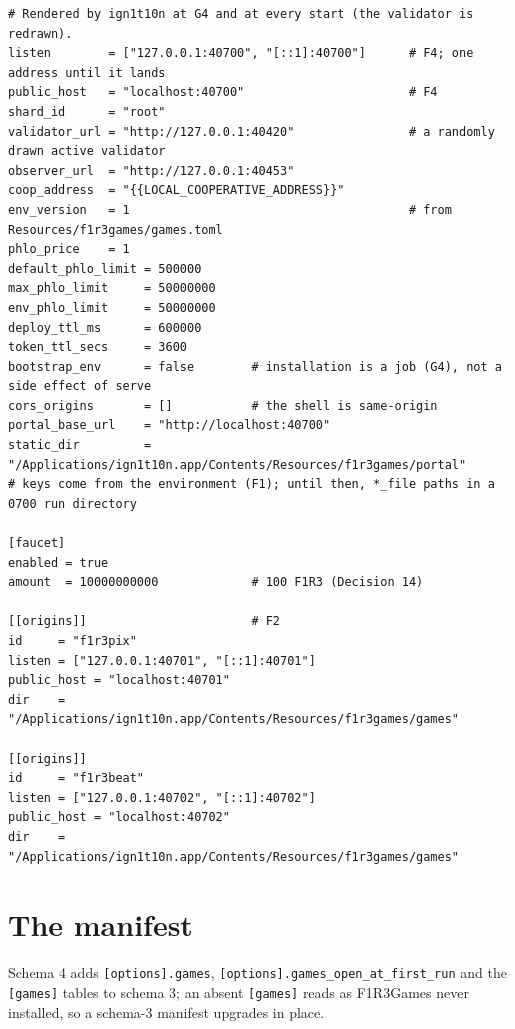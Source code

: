 \documentclass[11pt]{article}
\theoremstyle{definition}
\theoremstyle{remark}
\newcommand{\code}[1]{\texttt{#1}}
\newcommand{\Gm}{F1R3Games}
\begin{document}
\begin{lstlisting}[language=Conf]
# Rendered by ign1t10n at G4 and at every start (the validator is redrawn).
listen        = ["127.0.0.1:40700", "[::1]:40700"]      # F4; one address until it lands
public_host   = "localhost:40700"                       # F4
shard_id      = "root"
validator_url = "http://127.0.0.1:40420"                # a randomly drawn active validator
observer_url  = "http://127.0.0.1:40453"
coop_address  = "{{LOCAL_COOPERATIVE_ADDRESS}}"
env_version   = 1                                       # from Resources/f1r3games/games.toml
phlo_price    = 1
default_phlo_limit = 500000
max_phlo_limit     = 50000000
env_phlo_limit     = 50000000
deploy_ttl_ms      = 600000
token_ttl_secs     = 3600
bootstrap_env      = false        # installation is a job (G4), not a side effect of serve
cors_origins       = []           # the shell is same-origin
portal_base_url    = "http://localhost:40700"
static_dir         = "/Applications/ign1t10n.app/Contents/Resources/f1r3games/portal"
# keys come from the environment (F1); until then, *_file paths in a 0700 run directory

[faucet]
enabled = true
amount  = 10000000000             # 100 F1R3 (Decision 14)

[[origins]]                       # F2
id     = "f1r3pix"
listen = ["127.0.0.1:40701", "[::1]:40701"]
public_host = "localhost:40701"
dir    = "/Applications/ign1t10n.app/Contents/Resources/f1r3games/games"

[[origins]]
id     = "f1r3beat"
listen = ["127.0.0.1:40702", "[::1]:40702"]
public_host = "localhost:40702"
dir    = "/Applications/ign1t10n.app/Contents/Resources/f1r3games/games"
\end{lstlisting}

\section{The manifest}\label{app:manifest}

Schema 4 adds \code{[options].games}, \code{[options].games\_open\_at\_first\_run}
and the \code{[games]} tables to schema 3; an absent \code{[games]} reads as
\Gm{} never installed, so a schema-3 manifest upgrades in place.
\end{document}
